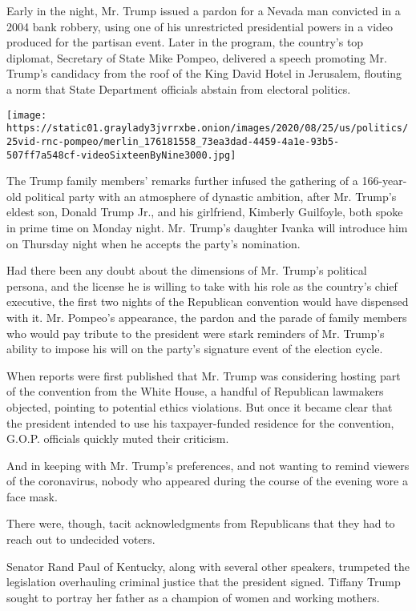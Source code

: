 Early in the night, Mr. Trump issued a pardon for a Nevada man convicted
in a 2004 bank robbery, using one of his unrestricted presidential
powers in a video produced for the partisan event. Later in the program,
the country's top diplomat, Secretary of State Mike Pompeo, delivered a
speech promoting Mr. Trump's candidacy from the roof of the King David
Hotel in Jerusalem, flouting a norm that State Department officials
abstain from electoral politics.

\texttt{[image: https://static01.graylady3jvrrxbe.onion/images/2020/08/25/us/politics/25vid-rnc-pompeo/merlin\_176181558\_73ea3dad-4459-4a1e-93b5-507ff7a548cf-videoSixteenByNine3000.jpg]}

The Trump family members' remarks further infused the gathering of a
166-year-old political party with an atmosphere of dynastic ambition,
after Mr. Trump's eldest son, Donald Trump Jr., and his girlfriend,
Kimberly Guilfoyle, both spoke in prime time on Monday night. Mr.
Trump's daughter Ivanka will introduce him on Thursday night when he
accepts the party's nomination.

Had there been any doubt about the dimensions of Mr. Trump's political
persona, and the license he is willing to take with his role as the
country's chief executive, the first two nights of the Republican
convention would have dispensed with it. Mr. Pompeo's appearance, the
pardon and the parade of family members who would pay tribute to the
president were stark reminders of Mr. Trump's ability to impose his will
on the party's signature event of the election cycle.

When reports were first published that Mr. Trump was considering hosting
part of the convention from the White House, a handful of Republican
lawmakers objected, pointing to potential ethics violations. But once it
became clear that the president intended to use his taxpayer-funded
residence for the convention, G.O.P. officials quickly muted their
criticism.

And in keeping with Mr. Trump's preferences, and not wanting to remind
viewers of the coronavirus, nobody who appeared during the course of the
evening wore a face mask.

There were, though, tacit acknowledgments from Republicans that they had
to reach out to undecided voters.

Senator Rand Paul of Kentucky, along with several other speakers,
trumpeted the legislation overhauling criminal justice that the
president signed. Tiffany Trump sought to portray her father as a
champion of women and working mothers.

